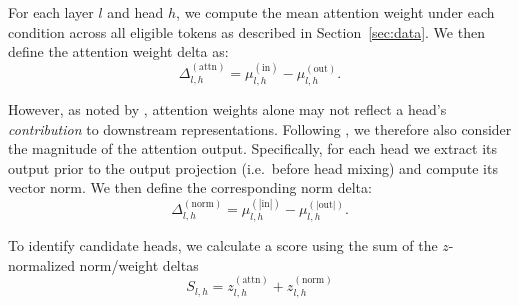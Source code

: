 \documentclass[11pt]{article}
\begin{document}
For each layer $l$ and head $h$, we compute the mean attention weight under each condition across all eligible tokens as described in Section~\ref{sec:data}. We then define the attention weight delta as:
\begin{equation}\label{eq:delta_attn}
\Delta^{(\text{attn})}_{l,h} = \mu_{l,h}^{(\text{in})} - \mu_{l,h}^{(\text{out})}.
\end{equation}

However, as noted by \citet{jain2019}, attention weights alone may not reflect a head's \textit{contribution} to downstream representations. Following \citet{kobayashi2020}, we therefore also consider the magnitude of the attention output. Specifically, for each head we extract its output prior to the output projection (i.e.\ before head mixing) and compute its vector norm. We then define the corresponding norm delta:
\begin{equation}\label{eq:delta_norm}
\Delta^{(\text{norm})}_{l,h} = \mu_{l,h}^{(|\text{in}|)} - \mu_{l,h}^{(|\text{out}|)}.
\end{equation}

To identify candidate heads, we calculate a score using the sum of the $z$-normalized norm/weight deltas
\begin{equation}\label{eq:headscore}
S_{l,h} = z^{(\text{attn})}_{l,h} + z^{(\text{norm})}_{l,h}
\end{equation}


%


\end{document}
